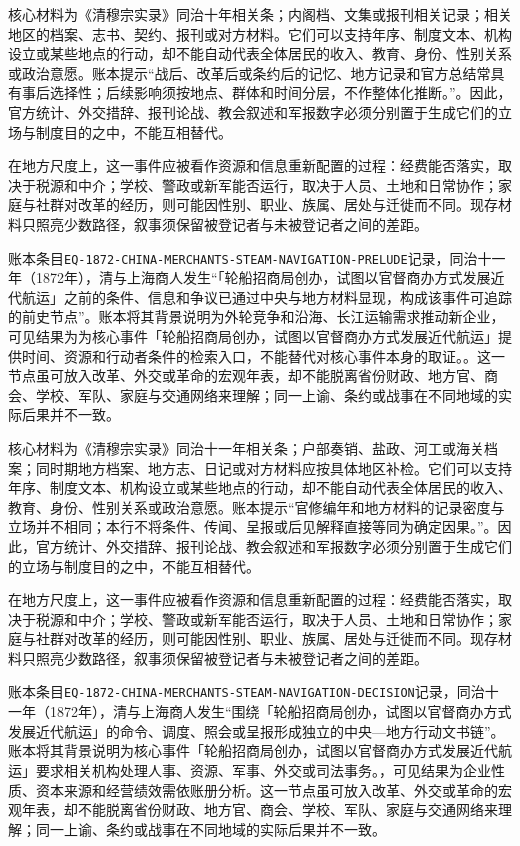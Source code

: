 核心材料为《清穆宗实录》同治十年相关条；内阁档、文集或报刊相关记录；相关地区的档案、志书、契约、报刊或对方材料。它们可以支持年序、制度文本、机构设立或某些地点的行动，却不能自动代表全体居民的收入、教育、身份、性别关系或政治意愿。账本提示“战后、改革后或条约后的记忆、地方记录和官方总结常具有事后选择性；后续影响须按地点、群体和时间分层，不作整体化推断。”。因此，官方统计、外交措辞、报刊论战、教会叙述和军报数字必须分别置于生成它们的立场与制度目的之中，不能互相替代。

在地方尺度上，这一事件应被看作资源和信息重新配置的过程：经费能否落实，取决于税源和中介；学校、警政或新军能否运行，取决于人员、土地和日常协作；家庭与社群对改革的经历，则可能因性别、职业、族属、居处与迁徙而不同。现存材料只照亮少数路径，叙事须保留被登记者与未被登记者之间的差距。

账本条目\texttt{EQ-1872-CHINA-MERCHANTS-STEAM-NAVIGATION-PRELUDE}记录，同治十一年（1872年），清与上海商人发生“「轮船招商局创办，试图以官督商办方式发展近代航运」之前的条件、信息和争议已通过中央与地方材料显现，构成该事件可追踪的前史节点”。账本将其背景说明为外轮竞争和沿海、长江运输需求推动新企业，可见结果为为核心事件「轮船招商局创办，试图以官督商办方式发展近代航运」提供时间、资源和行动者条件的检索入口，不能替代对核心事件本身的取证。。这一节点虽可放入改革、外交或革命的宏观年表，却不能脱离省份财政、地方官、商会、学校、军队、家庭与交通网络来理解；同一上谕、条约或战事在不同地域的实际后果并不一致。

核心材料为《清穆宗实录》同治十一年相关条；户部奏销、盐政、河工或海关档案；同时期地方档案、地方志、日记或对方材料应按具体地区补检。它们可以支持年序、制度文本、机构设立或某些地点的行动，却不能自动代表全体居民的收入、教育、身份、性别关系或政治意愿。账本提示“官修编年和地方材料的记录密度与立场并不相同；本行不将条件、传闻、呈报或后见解释直接等同为确定因果。”。因此，官方统计、外交措辞、报刊论战、教会叙述和军报数字必须分别置于生成它们的立场与制度目的之中，不能互相替代。

在地方尺度上，这一事件应被看作资源和信息重新配置的过程：经费能否落实，取决于税源和中介；学校、警政或新军能否运行，取决于人员、土地和日常协作；家庭与社群对改革的经历，则可能因性别、职业、族属、居处与迁徙而不同。现存材料只照亮少数路径，叙事须保留被登记者与未被登记者之间的差距。

账本条目\texttt{EQ-1872-CHINA-MERCHANTS-STEAM-NAVIGATION-DECISION}记录，同治十一年（1872年），清与上海商人发生“围绕「轮船招商局创办，试图以官督商办方式发展近代航运」的命令、调度、照会或呈报形成独立的中央—地方行动文书链”。账本将其背景说明为核心事件「轮船招商局创办，试图以官督商办方式发展近代航运」要求相关机构处理人事、资源、军事、外交或司法事务。，可见结果为企业性质、资本来源和经营绩效需依账册分析。这一节点虽可放入改革、外交或革命的宏观年表，却不能脱离省份财政、地方官、商会、学校、军队、家庭与交通网络来理解；同一上谕、条约或战事在不同地域的实际后果并不一致。

